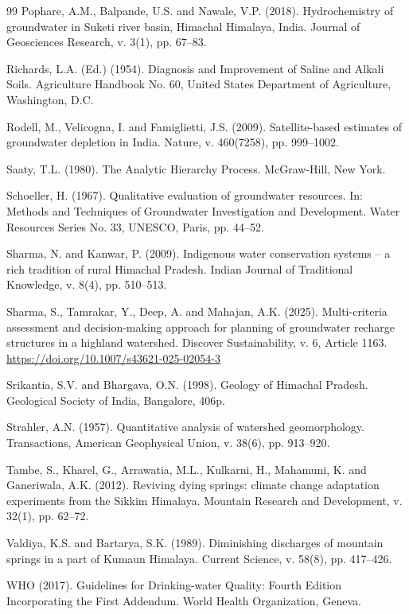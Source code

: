 \documentclass[10pt,a4paper,twocolumn]{article}
\begin{document}
\begin{thebibliography}{99}
Pophare, A.M., Balpande, U.S. and Nawale, V.P. (2018). Hydrochemistry of groundwater in Suketi
river basin, Himachal Himalaya, India. Journal of Geosciences Research, v. 3(1), pp. 67--83.

Richards, L.A. (Ed.) (1954). Diagnosis and Improvement of Saline and Alkali Soils. Agriculture
Handbook No. 60, United States Department of Agriculture, Washington, D.C.

Rodell, M., Velicogna, I. and Famiglietti, J.S. (2009). Satellite-based estimates of groundwater
depletion in India. Nature, v. 460(7258), pp. 999--1002.

Saaty, T.L. (1980). The Analytic Hierarchy Process. McGraw-Hill, New York.

Schoeller, H. (1967). Qualitative evaluation of groundwater resources. In: Methods and
Techniques of Groundwater Investigation and Development. Water Resources Series No. 33, UNESCO,
Paris, pp. 44--52.

Sharma, N. and Kanwar, P. (2009). Indigenous water conservation systems -- a rich tradition of
rural Himachal Pradesh. Indian Journal of Traditional Knowledge, v. 8(4), pp. 510--513.

Sharma, S., Tamrakar, Y., Deep, A. and Mahajan, A.K. (2025). Multi-criteria assessment and
decision-making approach for planning of groundwater recharge structures in a highland
watershed. Discover Sustainability, v. 6, Article 1163.
\url{https://doi.org/10.1007/s43621-025-02054-3}

Srikantia, S.V. and Bhargava, O.N. (1998). Geology of Himachal Pradesh. Geological Society of
India, Bangalore, 406p.

Strahler, A.N. (1957). Quantitative analysis of watershed geomorphology. Transactions, American
Geophysical Union, v. 38(6), pp. 913--920.

Tambe, S., Kharel, G., Arrawatia, M.L., Kulkarni, H., Mahamuni, K. and Ganeriwala, A.K. (2012).
Reviving dying springs: climate change adaptation experiments from the Sikkim Himalaya.
Mountain Research and Development, v. 32(1), pp. 62--72.

Valdiya, K.S. and Bartarya, S.K. (1989). Diminishing discharges of mountain springs in a part
of Kumaun Himalaya. Current Science, v. 58(8), pp. 417--426.

WHO (2017). Guidelines for Drinking-water Quality: Fourth Edition Incorporating the First
Addendum. World Health Organization, Geneva.

\end{thebibliography}
\end{document}

